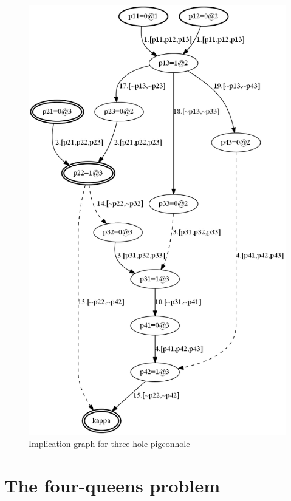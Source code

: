 \documentclass[11pt]{report}
\begin{document}
\begin{figure}
\begin{center}
\includegraphics[keepaspectratio=true,height=.9\textheight]{pigeon3-bw}
\end{center}
\caption{Implication graph for three-hole pigeonhole}\label{pigeon3}
\end{figure}

\clearpage

\chapter{The four-queens problem}\label{ch.queens}
\end{document}
